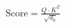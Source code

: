\documentclass[preview]{standalone}
\begin{document}
\begin{align*}
\text{Score} = \frac{Q \cdot K^T}{\sqrt{d_k}}
\end{align*}
\end{document}
